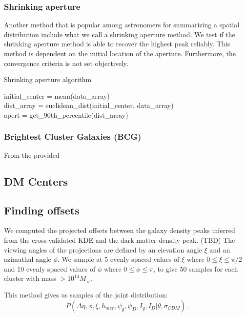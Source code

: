 \documentclass[letterpaper,useAMS,usenatbib]{mn2e}
\begin{document}
\subsubsection{Shrinking aperture}
Another method that is popular among astronomers for summarizing a spatial
distribution include what we call a shrinking aperture method.
We test if the shrinking aperture method is able to recover the highest peak reliably.
This method is dependent on the initial location of the aperture.
Furthermore, the convergence criteria is not set objectively.
\begin{algorithm}
	\caption{Shrinking aperture algorithm}
	 \hrulefill

	initial_center = mean(data\_array)\\
 	dist\_array = euclidean_dist(initial_center, data_array)\\
 	apert = get\_90th\_percentile(dist\_array)\\ 
	   \hrulefill
 \end{algorithm}


\subsubsection{Brightest Cluster Galaxies (BCG)}
From the provided 


\subsection{DM Centers}
\subsection{Finding offsets} 

We computed the projected offsets between the galaxy density peaks inferred from the
cross-validated KDE and the dark matter density peak. (TBD) 
The viewing angles of the projections are defined by an elevation angle
$\xi$ and an azimuthal angle $\phi$. 
We sample at 5 evenly spaced values of $\xi$ where $0 \leq \xi \leq \pi / 2$ and 
10 evenly spaced values of $\phi$ where $0 \leq \phi \leq \pi$, to give 50
samples for each cluster with mass $> 10^{14} M_\sun$. 

This method gives us samples of the joint distribution: 
\begin{equation}
	P(\Delta \eta, \phi, \xi, h_{mer}, \psi_g, \psi_D, I_g, I_D | \theta,
	\sigma_{CDM}). 
\end{equation}
\end{document}
